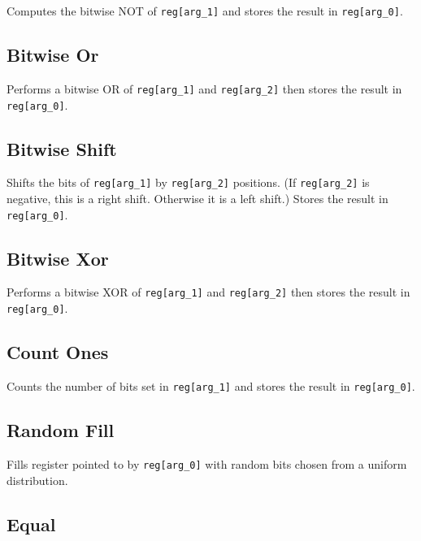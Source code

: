 
Computes the bitwise NOT of \texttt{reg[arg\_1]} and stores the result in \texttt{reg[arg\_0]}.

\subsection{Bitwise Or}


Performs a bitwise OR of \texttt{reg[arg\_1]} and \texttt{reg[arg\_2]} then stores the result in \texttt{reg[arg\_0]}.

\subsection{Bitwise Shift}


Shifts the bits of \texttt{reg[arg\_1]} by \texttt{reg[arg\_2]} positions.
(If \texttt{reg[arg\_2]} is negative, this is a right shift.
Otherwise it is a left shift.)
Stores the result in \texttt{reg[arg\_0]}.

\subsection{Bitwise Xor}


Performs a bitwise XOR of \texttt{reg[arg\_1]} and \texttt{reg[arg\_2]} then stores the result in \texttt{reg[arg\_0]}.

\subsection{Count Ones}


Counts the number of bits set in \texttt{reg[arg\_1]} and stores the result in \texttt{reg[arg\_0]}.

\subsection{Random Fill}


Fills register pointed to by \texttt{reg[arg\_0]} with random bits chosen from a uniform distribution.

\subsection{Equal}

